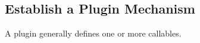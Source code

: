 \subsection{Establish a Plugin Mechanism}
\label{plugins}

A plugin generally defines one or more callables.